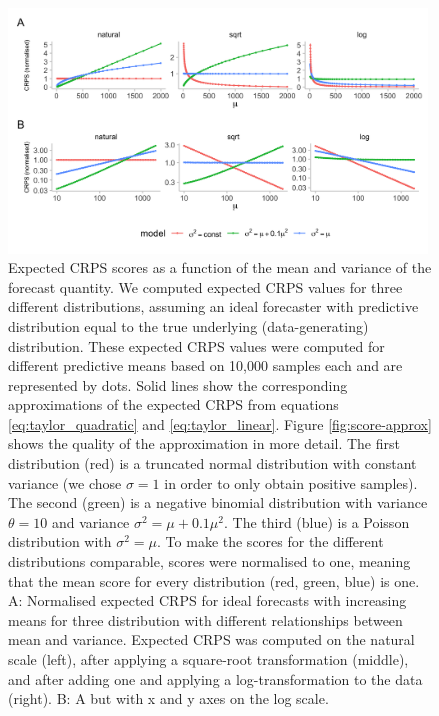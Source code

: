 \documentclass{article}
\begin{document}
\begin{figure}[h!]
    \centering
    \includegraphics[width=0.99\textwidth]{output/figures/SIM-mean-state-size.png}
    \caption{Expected CRPS scores as a function of the mean and variance of the forecast quantity. We computed expected CRPS values  for three different distributions, assuming an ideal forecaster with predictive distribution equal to the true underlying (data-generating) distribution. 
    These expected CRPS values were computed for different predictive means based on 10,000 samples each and are represented by dots. Solid lines show the corresponding approximations of the expected CRPS from equations \eqref{eq:taylor_quadratic} and \eqref{eq:taylor_linear}. Figure \ref{fig:score-approx} shows the quality of the approximation in more detail. 
    The first distribution (red) is a truncated normal distribution with constant variance (we chose $\sigma = 1$ in order to only obtain positive samples). The second (green) is a negative binomial distribution with variance $\theta = 10$ and variance $\sigma^2 = \mu + 0.1\mu^2$. The third (blue) is a
    Poisson distribution with $\sigma^2 = \mu$. To make the scores for the different distributions comparable, scores were normalised to one, meaning that the mean score for every distribution (red, green, blue) is one. 
    A: Normalised expected CRPS for ideal forecasts with increasing means for three distribution with different relationships between mean and variance. Expected CRPS was computed on the natural scale (left), after applying a square-root transformation (middle), and after adding one and applying a log-transformation to the data (right). B: A but with x and y axes on the log scale.}
    \label{fig:SIM-wis-state-size-mean}
\end{figure}
\end{document}

